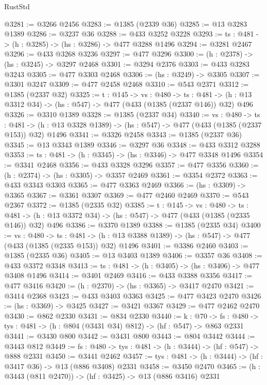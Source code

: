 \begin{lexlean}{RustStd}
\begin{coremodule}
@3281 := @3266 @2456
@3283 := @1385 (@2339 @36)
@3285 := @13 @3283 @1389
@3286 := @3237 @36
@3288 := @433 @3252 @3228
@3293 := {ts : @481} -> (h : @3285) -> (hs : @3286) -> @477 @3288 @1496
@3294 := @3281 @2467
@3296 := @433 @3268 @3236
@3297 := @477 @3296
@3300 := (h : @2378) -> (hs : @3245) -> @3297 @2468
@3301 := @3294 @2376
@3303 := @433 @3283 @3243
@3305 := @477 @3303 @2468
@3306 := (hs : @3249) -> @3305
@3307 := @3301 @3247
@3309 := @477 @2458 @2468
@3310 := @543 @2371
@3312 := @1385 (@2337 @32)
@3325 := {t : @145} ->
  {vs : @480} ->
  {ts : @481} -> (h : @13 @3312 @34) -> (hs : @547) -> @477 (@433 (@1385 (@2337 @146)) @32) @496
@3326 := @3310 @1389
@3328 := @1385 (@2337 @34)
@3340 := {vs : @480} ->
  {ts : @481} -> (h : @13 @3328 @1389) -> (hs : @547) -> @477 (@433 (@1385 (@2337 @153)) @32) @1496
@3341 := @3326 @2458
@3343 := @1385 (@2337 @36)
@3345 := @13 @3343 @1389
@3346 := @3297 @36
@3348 := @433 @3312 @3288
@3353 := {ts : @481} -> (h : @3345) -> (hs : @3346) -> @477 @3348 @1496
@3354 := @3341 @2468
@3356 := @433 @3328 @3296
@3357 := @477 @3356
@3360 := (h : @2374) -> (hs : @3305) -> @3357 @2469
@3361 := @3354 @2372
@3363 := @433 @3343 @3303
@3365 := @477 @3363 @2469
@3366 := (hs : @3309) -> @3365
@3367 := @3361 @3307
@3369 := @477 @2460 @2469
@3370 := @543 @2367
@3372 := @1385 (@2335 @32)
@3385 := {t : @145} ->
  {vs : @480} ->
  {ts : @481} -> (h : @13 @3372 @34) -> (hs : @547) -> @477 (@433 (@1385 (@2335 @146)) @32) @496
@3386 := @3370 @1389
@3388 := @1385 (@2335 @34)
@3400 := {vs : @480} ->
  {ts : @481} -> (h : @13 @3388 @1389) -> (hs : @547) -> @477 (@433 (@1385 (@2335 @153)) @32) @1496
@3401 := @3386 @2460
@3403 := @1385 (@2335 @36)
@3405 := @13 @3403 @1389
@3406 := @3357 @36
@3408 := @433 @3372 @3348
@3413 := {ts : @481} -> (h : @3405) -> (hs : @3406) -> @477 @3408 @1496
@3414 := @3401 @2469
@3416 := @433 @3388 @3356
@3417 := @477 @3416
@3420 := (h : @2370) -> (hs : @3365) -> @3417 @2470
@3421 := @3414 @2368
@3423 := @433 @3403 @3363
@3425 := @477 @3423 @2470
@3426 := (hs : @3369) -> @3425
@3427 := @3421 @3367
@3429 := @477 @2462 @2470
@3430 := @862 @2330
@3431 := @834 @2330
@3440 := {k : @70} ->
  {fs : @480} -> {tys : @481} -> (h : @804 (@3431 @34) @812) -> (hf : @547) -> @863 @2331
@3441 := @3430 @800
@3442 := @3431 @800
@3443 := @804 @3442
@3444 := @3443 @812
@3449 := {fs : @480} -> {tys : @481} -> (h : @3444) -> (hf : @547) -> @888 @2331
@3450 := @3441 @2462
@3457 := {tys : @481} -> (h : @3444) -> (hf : @3417 @36) -> @13 (@886 @3408) @2331
@3458 := @3450 @2470
@3465 := (h : @3443 (@811 @2470)) -> (hf : @3425) -> @13 (@886 @3416) @2331

\end{coremodule}
\end{lexlean}
